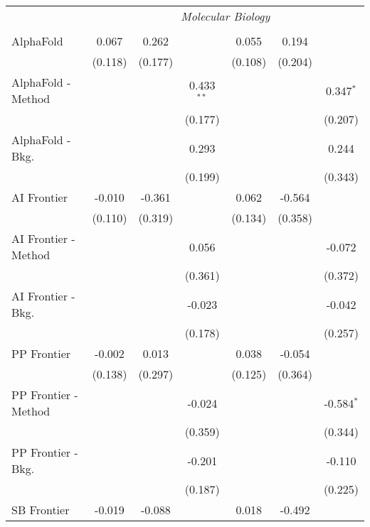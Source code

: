 \begin{tabular}{lcccccc}
 & \multicolumn{6}{c}{\textit{Molecular Biology}} \\ \\
   AlphaFold            & 0.067   & 0.262   &              & 0.055   & 0.194   &   \\   
                        & (0.118) & (0.177) &              & (0.108) & (0.204) &   \\   
   AlphaFold - Method   &         &         & 0.433$^{**}$ &         &         & 0.347$^{*}$\\   
                        &         &         & (0.177)      &         &         & (0.207)\\   
   AlphaFold - Bkg.     &         &         & 0.293        &         &         & 0.244\\   
                        &         &         & (0.199)      &         &         & (0.343)\\   
   AI Frontier          & -0.010  & -0.361  &              & 0.062   & -0.564  &   \\   
                        & (0.110) & (0.319) &              & (0.134) & (0.358) &   \\   
   AI Frontier - Method &         &         & 0.056        &         &         & -0.072\\   
                        &         &         & (0.361)      &         &         & (0.372)\\   
   AI Frontier - Bkg.   &         &         & -0.023       &         &         & -0.042\\   
                        &         &         & (0.178)      &         &         & (0.257)\\   
   PP Frontier          & -0.002  & 0.013   &              & 0.038   & -0.054  &   \\   
                        & (0.138) & (0.297) &              & (0.125) & (0.364) &   \\   
   PP Frontier - Method &         &         & -0.024       &         &         & -0.584$^{*}$\\   
                        &         &         & (0.359)      &         &         & (0.344)\\   
   PP Frontier - Bkg.   &         &         & -0.201       &         &         & -0.110\\   
                        &         &         & (0.187)      &         &         & (0.225)\\   
   SB Frontier          & -0.019  & -0.088  &              & 0.018   & -0.492  &   \\   

\end{tabular}
